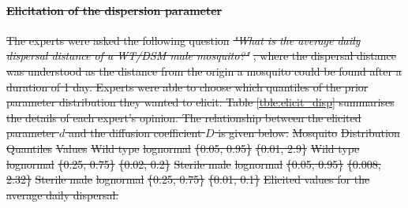 \documentclass[]{bmcart}
\providecommand{\DIFdeltex}[1]{{\protect\color{red}\sout{#1}}}                      %
\providecommand{\DIFdelFL}[1]{\DIFdel{#1}} %
\providecommand{\DIFdel}[1]{\texorpdfstring{\DIFdeltex{#1}}{}} %
\begin{document}
\begin{backmatter}
\paragraph{\DIFdel{Elicitation of the dispersion parameter}}
\addtocounter{paragraph}{-1}%
\DIFdel{The experts  were asked the following question }\emph{\DIFdel{"What is the average daily dispersal distance of a WT/DSM male mosquito?"}}%
\DIFdel{, where the dispersal distance was understood as the distance from the origin a mosquito could be found after a duration of 1 day. Experts were able to choose which quantiles of the prior parameter distribution they wanted to elicit. Table \ref{tble:elicit_disp} summarises the details of each expert's opinion. The relationship between the elicited parameter $d$ and the diffusion coefficient $D$ is given below.
}%
\DIFdelFL{Mosquito }%
\DIFdelFL{Distribution }%
\DIFdelFL{Quantiles }%
\DIFdelFL{Values  }%
\DIFdelFL{Wild type }%
\DIFdelFL{lognormal }%
\DIFdelFL{\{0.05, 0.95\} }%
\DIFdelFL{\{0.01, 2.9\}}%
\DIFdelFL{Wild type }%
\DIFdelFL{lognormal }%
\DIFdelFL{\{0.25, 0.75\} }%
\DIFdelFL{\{0.02, 0.2\}}%
\DIFdelFL{Sterile male }%
\DIFdelFL{lognormal }%
\DIFdelFL{\{0.05, 0.95\} }%
\DIFdelFL{\{0.008, 2.32\}}%
\DIFdelFL{Sterile male }%
\DIFdelFL{lognormal }%
\DIFdelFL{\{0.25, 0.75\} }%
\DIFdelFL{\{0.01, 0.1\}}%
{%
\DIFdelFL{Elicited values for the average daily dispersal. }}


\end{backmatter}
\end{document}
